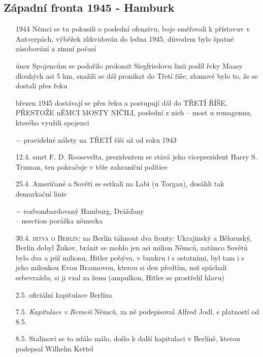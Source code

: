 \documentclass{article}
\begin{document}
\subsection*{Západní fronta 1945 - Hamburk}
\begin{itemize}
    \vspace{-0.5em}
    \setlength\itemsep{0.15em}
    \item[1944] Němci se tu pokusili o poslední ofenzivu, boje směřovali k přístavuv v Antverpách, výběžek zlikvidován do ledna 1945, důvodem bylo špatné zásobování a zimní počasí
    \item[únor] Spojencům se podařilo prolomit Siegfriedovu linii podíl řeky Maasy dlouhých asi 5 km, snažili se dál pronikat do Třetí říše, zlomové bylo to, že se dostali přes řeku
    \item[březen 1945] dostávají se přes řeku a postupují dál do TŘETÍ ŘÍŠE, PŘESTOŽE nĚMCI MOSTY NIČILI, poslední z nich -- most u remagennu, kterého využili spojenci
    \item[$-$] pravidelné nálety na TŘETÍ říši už od roku 1943
    \item[12.4.] smrt F. D. Roosevelta, prezidentem se stává jeho viceprezident Harry S. Truman, ten pokračuje v téže zahraniční politice
    \item[25.4.] Američané a Sověti se setkali na Labi (u Torgau), dosáhli tak demarkační linie
    \item[$-$] rozbombardovaný Hamburg, Drážďany\\
    -- nsection porážka německa
    \item[30.4.] \textsc{bitva o Berlín}: na Berlín táhnout dva fronty: Ukrajinský a Běloruský, Berlín dobyl Žukov, bránit se mohlo jen asi milion Němců, zatímco Sovětů bylo dva a půl milionu, Hitler pobýva, v bunkru i s ostatními, byl tam i s jeho milenkou Evou Braunovou, kterou si den předtím, než spáchali sebevraždu, si ji vzal za ženu (ampulkou, Hitler se prostřelil hlavu)
    \item[2.5.] oficiální kapitulace Berlína
    \item[7.5.] \textit{Kapitulace v Remeši} Němců, za ně podepisoval Alfred Jodl, s platností od 8.5.
    \item[8.5.] Stalinovi se to zdálo málo, došlo k další kapitulaci v Berlíně, kterou podepsal Wilhelm Kettel
\end{itemize}
\end{document}
